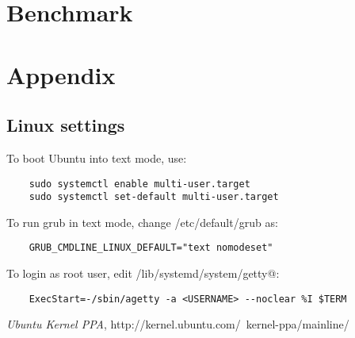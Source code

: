 \documentclass{article}
\begin{document}
\section{Benchmark}




\section{Appendix}

\subsection{Linux settings}

To boot Ubuntu into text mode, use:

\begin{verbatim}
    sudo systemctl enable multi-user.target
    sudo systemctl set-default multi-user.target
\end{verbatim}

To run grub in text mode, change /etc/default/grub as:

\begin{verbatim}
    GRUB_CMDLINE_LINUX_DEFAULT="text nomodeset"
\end{verbatim}

To login as root user, edit /lib/systemd/system/getty@:

\begin{verbatim}
    ExecStart=-/sbin/agetty -a <USERNAME> --noclear %I $TERM
\end{verbatim}


\begin{thebibliography}{9}
    \raggedright
    \emph{Ubuntu Kernel PPA},
    http://kernel.ubuntu.com/~kernel-ppa/mainline/
\end{thebibliography}
\end{document}
